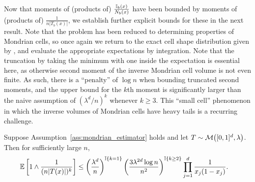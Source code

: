 Now that moments of (products of) $\frac{\mathbb{I}_b(x)}{N_b(x)}$
have been bounded by moments of
(products of) $\frac{1}{n |T_b(x)|}$, we establish further
explicit bounds for these in the next result.
Note that the problem has been reduced to determining
properties of Mondrian cells, so once again we return to the
exact cell shape distribution given by \citet{mourtada2020minimax},
and evaluate the appropriate expectations by integration.
Note that the truncation by taking the minimum with one inside the expectation
is essential here, as otherwise second moment of the inverse Mondrian cell
volume is not even finite. As such, there is a ``penalty'' of $\log n$
when bounding truncated second moments,
and the upper bound for the $k$th moment is significantly
larger than the naive assumption of $(\lambda^d / n)^k$
whenever $k \geq 3$.
This ``small cell'' phenomenon in which the inverse volumes of Mondrian cells
have heavy tails is a recurring challenge.

\begin{lemma}%
  \label{lem:mondrian_app_moment_cell}

  Suppose Assumption~\ref{ass:mondrian_estimator} holds
  and let $T \sim \mathcal{M}\big([0,1]^d, \lambda\big)$.
  Then for sufficiently large $n$,
  \begin{align*}
    \mathbb{E}\left[
      1 \wedge
      \frac{1}{(n |T(x)|)^k}
    \right]
    &\leq
    \left(
      \frac{\lambda^d}{n}
    \right)^{\mathbb{I} \left\{ k = 1 \right\}}
    \left(
      \frac{3 \lambda^{2d} \log n}{n^2}
    \right)^{\mathbb{I} \left\{ k \geq 2 \right\}}
    \prod_{j=1}^{d} \frac{1}{x_j (1-x_j)}.
  \end{align*}
\end{lemma}

